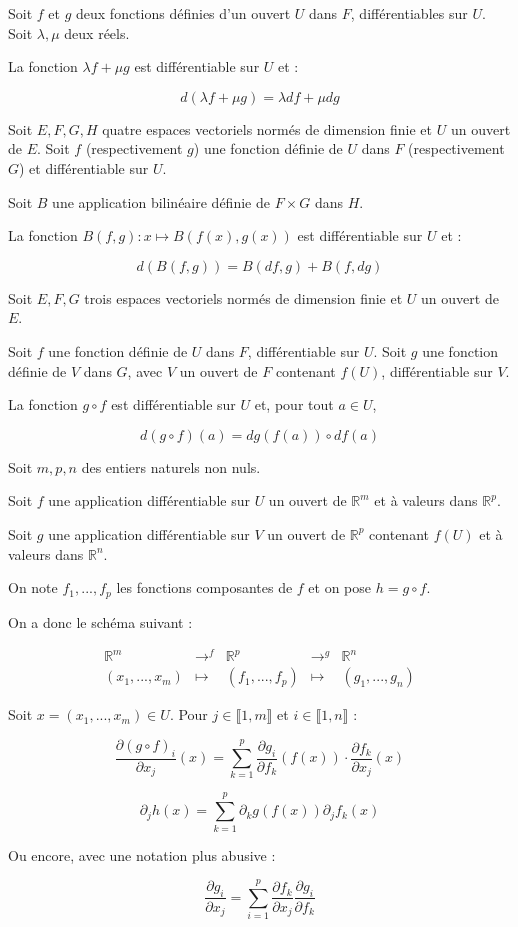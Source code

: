 \documentclass[a4paper,12pt]{book}
\newcommand{\Thr}[2]{\begin{tcolorbox}[sharp corners, colback=white,colframe=red!10!blue!30!green!75!, title=Théorème : #1]#2\end{tcolorbox}}
\def\R{\mathbb{R}}
\begin{document}
\Thr{Différentielle d'une combinaison linéaire}{Soit $f$ et $g$ deux fonctions définies d'un ouvert $U$ dans $F$, différentiables sur $U$. Soit $\lambda, \mu$ deux réels.
\par La fonction $\lambda f +\mu g$ est différentiable sur $U$ et :
\par $$d(\lambda f+\mu g) = \lambda df+\mu dg$$}
\Thr{Différentielle d'une application bilinéaire}{Soit $E, F, G, H$ quatre espaces vectoriels normés de dimension finie et $U$ un ouvert de $E$. Soit $f$ (respectivement $g$) une fonction définie de $U$ dans $F$ (respectivement $G$) et différentiable sur $U$.
\par Soit $B$ une application bilinéaire définie de $F\times G$ dans $H$.
\par La fonction $B(f, g):x\mapsto B(f(x), g(x))$ est différentiable sur $U$ et :
\par $$d(B(f, g)) = B(df, g)+B(f, dg)$$}
\Thr{Différentielle d'une composée}{Soit $E,F, G$ trois espaces vectoriels normés de dimension finie et $U$ un ouvert de $E$.
\par Soit $f$ une fonction définie de $U$ dans $F$, différentiable sur $U$. Soit $g$ une fonction définie de $V$ dans $G$, avec $V$ un ouvert de $F$ contenant $f(U)$, différentiable sur $V$.
\par La fonction $g\circ f$ est différentiable sur $U$ et, pour tout $a\in U$,
\par $$d(g\circ f)(a) = dg(f(a))\circ df(a)$$}
\Thr{Règle de la châine}{Soit $m,p,n$ des entiers naturels non nuls.
\par Soit $f$ une application différentiable sur $U$ un ouvert de $\R^m$ et à valeurs dans $\R^p$.
\par Soit $g$ une application différentiable sur $V$ un ouvert de $\R^p$ contenant $f(U)$ et à valeurs dans $\R^n$.
\par On note $f_1,..., f_p$ les fonctions composantes de $f$ et on pose $h = g\circ f$.
\par On a donc le schéma suivant :
\par $$\begin{array}{ccccc} \R^m & \to^f & \R^p & \to^g & \R^n \\ (x_1,...,x_m) & \mapsto & (f_1,..., f_p) & \mapsto & (g_1,..., g_n)\end{array}$$
\par Soit $x=(x_1,..., x_m)\in U$. Pour $j\in \llbracket 1, m\rrbracket$ et $i\in\llbracket 1,n\rrbracket$ :
\par $$\dfrac{\partial (g\circ f)_i}{\partial x_j}(x) = \sum\limits_{k=1}^p\dfrac{\partial g_i}{\partial f_k}(f(x))\cdot\dfrac{\partial f_k}{\partial x_j}(x)$$
\par $$\partial_jh(x)=\sum\limits_{k=1}^p\partial_kg(f(x))\partial_jf_k(x)$$
\par Ou encore, avec une notation plus abusive :
\par $$\dfrac{\partial g_i}{\partial x_j}=\sum\limits_{i=1}^p\dfrac{\partial f_k}{\partial x_j}\dfrac{\partial g_i}{\partial f_k}$$}
\end{document}
